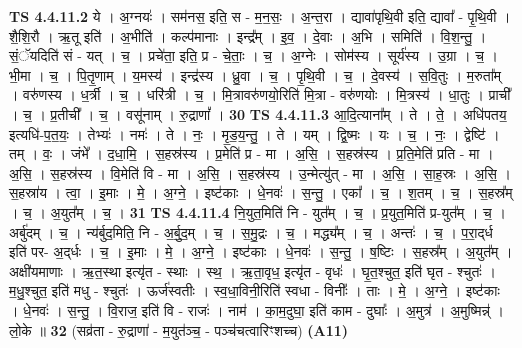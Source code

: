 \documentclass[17pt]{extarticle}
\begin{document}
                                \textbf{ TS 4.4.11.2} \newline
                  ये । अ॒ग्नयः॑ । सम॑नस॒ इति॒ स - म॒न॒सः॒ । अ॒न्त॒रा । द्यावा॑पृथि॒वी इति॒ द्यावा᳚ - पृ॒थि॒वी । शै॒शि॒रौ । ऋ॒तू इति॑ । अ॒भीति॑ । कल्प॑मानाः । इन्द्र᳚म् । इ॒व॒ । दे॒वाः । अ॒भि । समिति॑ । वि॒श॒न्तु॒ । सं॒ॅयदिति॑ सं - यत् । च॒ । प्रचे॑ता॒ इति॒ प्र - चे॒ताः॒ । च॒ । अ॒ग्नेः । सोम॑स्य । सूर्य॑स्य । उ॒ग्रा । च॒ । भी॒मा । च॒ । पि॒तृ॒णाम् । य॒मस्य॑ । इन्द्र॑स्य । ध्रु॒वा । च॒ । पृ॒थि॒वी । च॒ । दे॒वस्य॑ । स॒वि॒तुः । म॒रुता᳚म् । वरु॑णस्य । ध॒र्त्री । च॒ । धरि॑त्री । च॒ । मि॒त्रावरु॑णयो॒रिति॑ मि॒त्रा - वरु॑णयोः । मि॒त्रस्य॑ । धा॒तुः । प्राची᳚ । च॒ । प्र॒तीची᳚ । च॒ । वसू॑नाम् । रु॒द्राणां᳚ । \textbf{  30} \newline
                  \newline
                                \textbf{ TS 4.4.11.3} \newline
                  आ॒दि॒त्याना᳚म् । ते । ते॒ । अधि॑पतय॒ इत्यधि॑-प॒त॒यः॒ । तेभ्यः॑ । नमः॑ । ते । नः॒ । मृ॒ड॒य॒न्तु॒ । ते । यम् । द्वि॒ष्मः । यः । च॒ । नः॒ । द्वेष्टि॑ । तम् । वः॒ । जंभे᳚ । द॒धा॒मि॒ । स॒हस्र॑स्य । प्र॒मेति॑ प्र - मा । अ॒सि॒ । स॒हस्र॑स्य । प्र॒ति॒मेति॑ प्रति - मा । अ॒सि॒ । स॒हस्र॑स्य । वि॒मेति॑ वि - मा । अ॒सि॒ । स॒हस्र॑स्य । उ॒न्मेत्यु॑त् - मा । अ॒सि॒ । सा॒ह॒स्रः । अ॒सि॒ । स॒हस्रा॑य । त्वा॒ । इ॒माः । मे॒ । अ॒ग्ने॒ । इष्ट॑काः । धे॒नवः॑ । स॒न्तु॒ । एका᳚ । च॒ । श॒तम् । च॒ । स॒हस्र᳚म् । च॒ । अ॒युत᳚म् । च॒ । \textbf{  31} \newline
                  \newline
                                \textbf{ TS 4.4.11.4} \newline
                  नि॒युत॒मिति॑ नि - युत᳚म् । च॒ । प्र॒युत॒मिति॑ प्र-युत᳚म् । च॒ । अर्बु॑दम् । च॒ । न्य॑र्बुद॒मिति॒ नि - अ॒र्बु॒द॒म् । च॒ । स॒मु॒द्रः । च॒ । मद्ध्य᳚म् । च॒ । अन्तः॑ । च॒ । प॒रा॒द्‌र्ध इति॑ पर- अ॒द्‌र्धः । च॒ । इ॒माः । मे॒ । अ॒ग्ने॒ । इष्ट॑काः । धे॒नवः॑ । स॒न्तु॒ । ष॒ष्टिः । स॒हस्र᳚म् । अ॒युत᳚म् । अक्षी॑यमाणाः । ऋ॒त॒स्था इत्यृ॑त - स्थाः । स्थ॒ । ऋ॒ता॒वृध॒ इत्यृ॑त - वृधः॑ । घृ॒त॒श्चुत॒ इति॑ घृत - श्चुतः॑ । म॒धु॒श्चुत॒ इति॑ मधु - श्चुतः॑ । ऊर्ज॑स्वतीः । स्व॒धा॒विनी॒रिति॑ स्वधा - विनीः᳚ । ताः । मे॒ । अ॒ग्ने॒ । इष्ट॑काः । धे॒नवः॑ । स॒न्तु॒ । वि॒राज॒ इति॑ वि - राजः॑ । नाम॑ । का॒म॒दुघा॒ इति॑ काम - दुघाः᳚ । अ॒मुत्र॑ । अ॒मुष्मिन्न्॑ । लो॒के ॥ \textbf{  32} \newline
                  \newline
                      (सव्र॑ता - रु॒द्राणा॑ - म॒युत॑ञ्च॒ - पञ्च॑चत्वारिꣳशच्च)  \textbf{(A11)} \newline \newline
\end{document}
